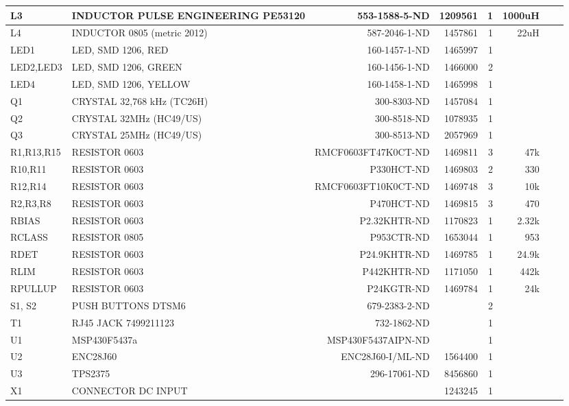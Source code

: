 \documentclass[12pt,a4paper,twoside,openright]{book}
\begin{document}
\begin{table}
\begin{tabular*}{0.7\textwidth}{|p{2.8cm}|p{6.3cm}|r|r|r|r|r|c|}
L3 & INDUCTOR PULSE ENGINEERING\newline
PE53120 & 553-1588-5-ND & 1209561 & 1 & 1000uH &  \\ \hline
L4 & INDUCTOR 0805 (metric 2012) & 587-2046-1-ND & 1457861 & 1 & 22uH &  \\ \hline
LED1 & LED, SMD 1206, RED & 160-1457-1-ND & 1465997 & 1 &  &  \\ \hline
LED2,LED3 & LED, SMD 1206, GREEN & 160-1456-1-ND & 1466000 & 2 &  &  \\ \hline
LED4 & LED, SMD 1206, YELLOW & 160-1458-1-ND & 1465998 & 1 &  &  \\ \hline
Q1 & CRYSTAL 32,768 kHz (TC26H) & 300-8303-ND & 1457084 & 1 &  &  \\ \hline
Q2 & CRYSTAL 32MHz (HC49/US) & 300-8518-ND & 1078935 & 1 &  &  \\ \hline
Q3 & CRYSTAL 25MHz (HC49/US) & 300-8513-ND & 2057969 & 1 &  &  \\ \hline
R1,R13,R15 & RESISTOR 0603 & RMCF0603FT47K0CT-ND & 1469811 & 3 & 47k &  \\ \hline
R10,R11 & RESISTOR 0603 & P330HCT-ND & 1469803 & 2 & 330 &   \\ \hline
R12,R14 & RESISTOR 0603 & RMCF0603FT10K0CT-ND & 1469748 & 3 & 10k &  \\ \hline
R2,R3,R8 & RESISTOR 0603 & P470HCT-ND & 1469815 & 3 & 470 &  \\ \hline
RBIAS & RESISTOR 0603 & P2.32KHTR-ND & 1170823 & 1 & 2.32k &  \\ \hline
RCLASS & RESISTOR 0805 & P953CTR-ND & 1653044 & 1 & 953 &  \\ \hline
RDET & RESISTOR 0603 & P24.9KHTR-ND & 1469785 & 1 & 24.9k &  \\ \hline
RLIM & RESISTOR 0603 & P442KHTR-ND & 1171050 & 1 & 442k &  \\ \hline
RPULLUP & RESISTOR 0603 & P24KGTR-ND & 1469784 & 1 & 24k &  \\ \hline
S1, S2 & PUSH BUTTONS DTSM6 & 679-2383-2-ND &  & 2 &  &   \\ \hline
T1 & RJ45 JACK 7499211123 & 732-1862-ND &  & 1 &  &  \\ \hline
U1 & MSP430F5437a & MSP430F5437AIPN-ND & \multicolumn{1}{l|}{} & 1 &  &  \\ \hline
U2 & ENC28J60 & ENC28J60-I/ML-ND & 1564400 & 1 &  &  \\ \hline
U3 & TPS2375 & 296-17061-ND & 8456860 & 1 &  &   \\ \hline
X1 & CONNECTOR DC INPUT &  & 1243245 & 1 &  &   \\ \hline
\end{tabular*}
\end{table}
\end{document}
